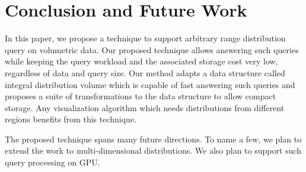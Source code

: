 \section{Conclusion and Future Work}
\label{sec:conclusion}
In this paper, we propose a technique to support arbitrary range distribution query on volumetric data. Our proposed technique allows answering such queries while keeping the query workload and the associated storage cost very low, regardless of data and query size. Our method adapts a data structure called integral distribution volume which is capable of fast answering such queries and proposes a suite of transformations to the data structure to allow compact storage. 
Any visualization algorithm which needs distributions from different regions benefits from this technique. 

The proposed technique spans many future directions. To name a few, we plan to extend the work to multi-dimensional distributions. We also plan to support such query processing on GPU.
